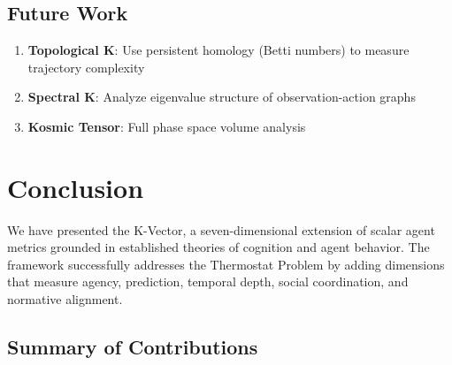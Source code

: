 \documentclass[11pt,a4paper]{article}
\begin{document}
\subsection{Future Work}

\begin{enumerate}
    \item \textbf{Topological K}: Use persistent homology (Betti numbers) to measure trajectory complexity
    \item \textbf{Spectral K}: Analyze eigenvalue structure of observation-action graphs
    \item \textbf{Kosmic Tensor}: Full phase space volume analysis
\end{enumerate}

\section{Conclusion}

We have presented the K-Vector, a seven-dimensional extension of scalar agent metrics grounded in established theories of cognition and agent behavior. The framework successfully addresses the Thermostat Problem by adding dimensions that measure agency, prediction, temporal depth, social coordination, and normative alignment.

\subsection{Summary of Contributions}
\end{document}

